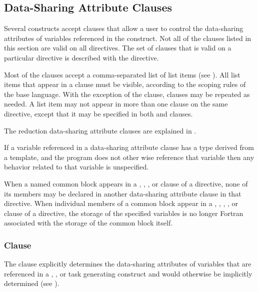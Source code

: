 \subsection{Data-Sharing Attribute Clauses}
\label{subsec:Data-Sharing Attribute Clauses}
Several constructs accept clauses that allow a user to control the data-sharing
attributes of variables referenced in the construct.  Not all of the clauses
listed in this section are valid on all directives. The set of clauses that is
valid on a particular directive is described with the directive.

Most of the clauses accept a comma-separated list of list items (see
). All list items that appear in a clause must be 
visible, according to the scoping rules of the base language. With the exception 
of the  clause, clauses may be repeated as needed. A list item may 
not appear in more than one clause on the same directive, except that it may be 
specified in both  and  clauses.

The reduction data-sharing attribute clauses are explained in 
.

\begin{cppspecific}
If a variable referenced in a data-sharing attribute clause has a type derived from a
template, and the program does not other wise reference that variable then any
behavior related to that variable is unspecified.
\end{cppspecific}

\begin{fortranspecific}
When a named common block appears in a , ,
, or  clause of a directive, none of its members 
may be declared in another data-sharing attribute clause in that directive. When 
individual members of a common block appear in a , ,
, , or  clause of a directive, the 
storage of the specified variables is no longer Fortran associated with the storage 
of the common block itself. 
\end{fortranspecific}



\subsubsection{ Clause}
\label{subsubsec:default clause}
\summary
The  clause explicitly determines the data-sharing attributes 
of variables that are referenced in a , , or task 
generating construct and would otherwise be implicitly determined (see
).

